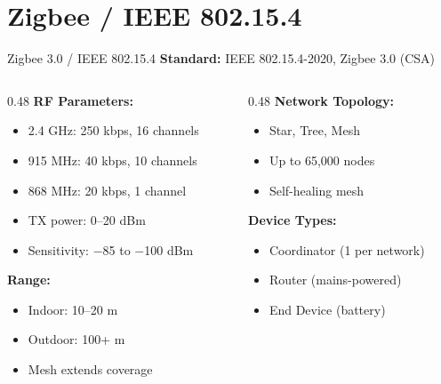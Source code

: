 \documentclass[aspectratio=169,11pt]{beamer}
\begin{document}
\section{Zigbee / IEEE 802.15.4}

\begin{frame}{Zigbee 3.0 / IEEE 802.15.4}
    \textbf{Standard:} IEEE 802.15.4-2020, Zigbee 3.0 (CSA)
    
    \vspace{0.3cm}
    \begin{columns}[T]
        \begin{column}{0.48\textwidth}
            \textbf{RF Parameters:}
            \begin{itemize}
                \item 2.4 GHz: 250 kbps, 16 channels
                \item 915 MHz: 40 kbps, 10 channels
                \item 868 MHz: 20 kbps, 1 channel
                \item TX power: 0--20 dBm
                \item Sensitivity: $-$85 to $-$100 dBm
            \end{itemize}
            
            \vspace{0.2cm}
            \textbf{Range:}
            \begin{itemize}
                \item Indoor: 10--20 m
                \item Outdoor: 100+ m
                \item Mesh extends coverage
            \end{itemize}
        \end{column}
        \begin{column}{0.48\textwidth}
            \textbf{Network Topology:}
            \begin{itemize}
                \item Star, Tree, Mesh
                \item Up to 65,000 nodes
                \item Self-healing mesh
            \end{itemize}
            
            \vspace{0.2cm}
            \textbf{Device Types:}
            \begin{itemize}
                \item Coordinator (1 per network)
                \item Router (mains-powered)
                \item End Device (battery)
            \end{itemize}
            

\end{column}
\end{columns}
\end{frame}
\end{document}

